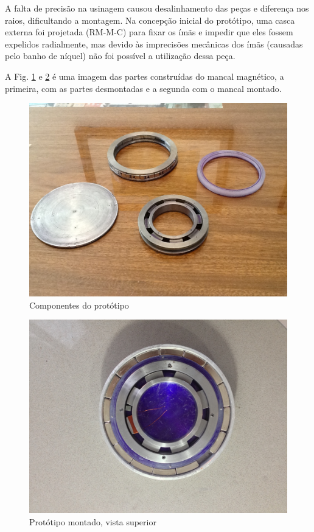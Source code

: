 A falta de precisão na usinagem causou desalinhamento das peças e diferença nos raios, dificultando a montagem. Na concepção inicial do protótipo, uma casca externa foi projetada (RM-M-C) para fixar os ímãs e impedir que eles fossem expelidos radialmente, mas devido às imprecisões mecânicas dos ímãs (causadas pelo banho de níquel) não foi possível a utilização dessa peça. 

A Fig. \ref{fig:partes} e \ref{fig:completo} é uma imagem das partes construídas do mancal magnético, a primeira, com as partes desmontadas e a segunda com o mancal montado.


\begin{figure}[ht!]
\centering
\includegraphics[width=0.8\linewidth]{Figs/img/partes}
\caption{Componentes do protótipo}
\label{fig:partes}
\end{figure}


\begin{figure}[ht!]
\centering
\includegraphics[width=0.8\linewidth]{Figs/img/completo}
\caption{Protótipo montado, vista superior}
\label{fig:completo}
\end{figure}



